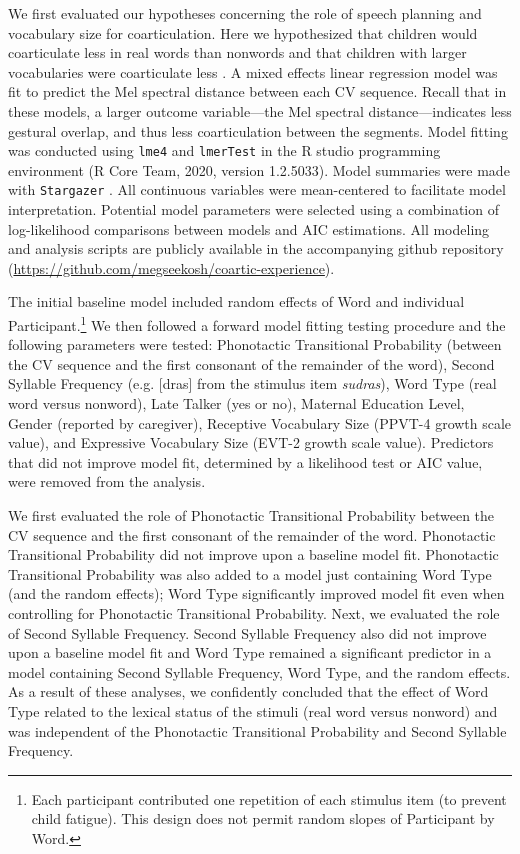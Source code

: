 \documentclass[a4paper,man,natbib,donotrepeattitle, apacite]{apa6}
\begin{document}
We first evaluated our hypotheses concerning the role of speech planning and vocabulary size for coarticulation. Here we hypothesized that children would coarticulate less in  real words than nonwords and that children with larger vocabularies were coarticulate less \cite{noiraySpokenLanguageDevelopment2019}. A mixed effects linear regression model was fit to predict the Mel spectral distance between each CV sequence. Recall that in these models, a larger outcome variable---the Mel spectral distance---indicates less gestural overlap, and thus less coarticulation between the segments. Model fitting was conducted using \texttt{lme4} \cite{batesFittingLinearMixedeffects2015} and \texttt{lmerTest} \cite{kuznetsovaLmerTestPackageTests2017} in the R studio programming environment (R Core Team, 2020, version 1.2.5033). Model summaries were made with \texttt{Stargazer} \cite{hlavacStargazerWellFormattedRegression2018}. All continuous variables were mean-centered to facilitate model interpretation. Potential model parameters were selected using a combination of log-likelihood comparisons between models and AIC estimations. All modeling and analysis scripts are publicly available in the accompanying github repository (\url{https://github.com/megseekosh/coartic-experience}). 

The initial baseline model included random effects of Word and individual Participant.\footnote{Each participant contributed one repetition of each stimulus item (to prevent child fatigue). This design does not permit random slopes of Participant by Word.} We then followed a forward model fitting testing procedure and the following parameters were tested: Phonotactic Transitional Probability (between the CV sequence and the first consonant of the remainder of the word), Second Syllable Frequency (e.g. [dras] from the stimulus item \textit{sudras}), Word Type (real word versus nonword), Late Talker (yes or no), Maternal Education Level, Gender (reported by caregiver), Receptive Vocabulary Size (PPVT-4 growth scale value), and Expressive Vocabulary Size (EVT-2 growth scale value). Predictors that did not improve model fit, determined by a likelihood test or AIC value, were removed from the analysis. 

We first evaluated the role of Phonotactic Transitional Probability between the CV sequence and the first consonant of the remainder of the word. Phonotactic Transitional Probability did not improve upon a baseline model fit. Phonotactic Transitional Probability was also added to a model just containing Word Type (and the random effects); Word Type significantly improved model fit even when controlling for Phonotactic Transitional Probability. Next, we evaluated the role of Second Syllable Frequency. Second Syllable Frequency also did not improve upon a baseline model fit and Word Type remained a significant predictor in a model containing Second Syllable Frequency, Word Type, and the random effects. As a result of these analyses, we confidently concluded that the effect of Word Type related to the lexical status of the stimuli (real word versus nonword) and was independent of the Phonotactic Transitional Probability and Second Syllable Frequency. 
\end{document}
